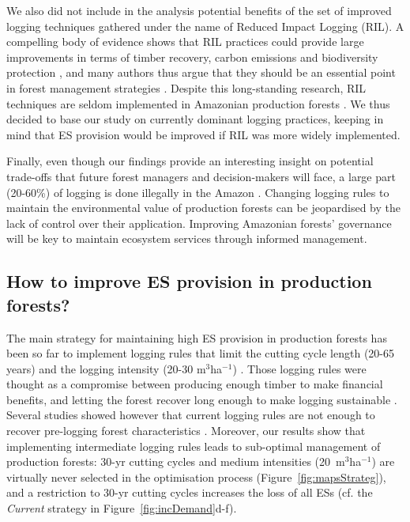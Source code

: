 \documentclass{article}
\begin{document}
We also did not include in the analysis potential benefits of the set of improved logging techniques gathered under the name of Reduced Impact Logging (RIL). A compelling body of evidence shows that RIL practices could provide large improvements in terms of timber recovery, carbon emissions and biodiversity protection \cite{Putz2008c,West2014,Tobler2018,Griscom2019}, and many authors thus argue that they should be an essential point in forest management strategies \cite{Runting2018}. Despite this long-standing research, RIL techniques are seldom implemented in Amazonian production forests \cite{Blaser2011}. We thus decided to base our study on currently dominant logging practices, keeping in mind that ES provision would be improved if RIL was more widely implemented. 

Finally, even though our findings provide an interesting insight on potential trade-offs that future forest managers and decision-makers will face, a large part (20-60\%) of logging is done illegally in the Amazon \cite{Finer2014,Brancalion2018}. Changing logging rules to maintain the environmental value of production forests can be jeopardised by the lack of control over their application. Improving Amazonian forests' governance will be key to maintain ecosystem services through informed management. 

\subsection{How to improve ES provision in production forests?}

The main strategy for maintaining high ES provision in production forests has been so far to implement logging rules that limit the cutting cycle length (20-65 years) and the logging intensity (20-30 m$^3$ha$^{-1}$) \cite{Blaser2011}. 
Those logging rules were thought as a compromise between producing enough timber to make financial benefits, and letting the forest recover long enough to make logging sustainable \cite{Seydack2012}.
Several studies showed however that current logging rules are not enough to recover pre-logging forest characteristics \cite{Zimmerman2012}.
Moreover, our results show that implementing intermediate logging rules leads to sub-optimal management of production forests: 30-yr cutting cycles and medium intensities (20~m$^3$ha$^{-1}$) are virtually never selected in the optimisation process (Figure~\ref{fig:mapsStrateg}), and a restriction to 30-yr cutting cycles increases the loss of all ESs (cf. the \textit{Current} strategy in Figure~\ref{fig:incDemand}d-f).  
\end{document}
